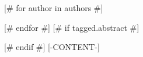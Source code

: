 [# for author in authors #]
\author{[- author.name -]}
[# endfor #]
[# if tagged.abstract #]
\begin{abstract}
[-tagged.abstract-]
\end{abstract}
[# endif #]
[-CONTENT-]